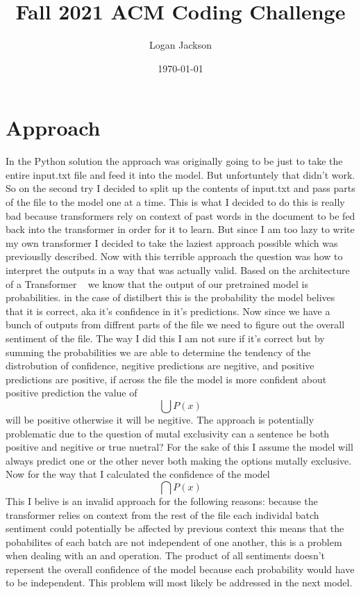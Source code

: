 \documentclass[12pt]{article}
\title{Fall 2021 ACM Coding Challenge}
\author{Logan Jackson}
\date{\today}
\begin{document}
\maketitle{}

\newpage
\section{Approach}
In the Python solution the approach was originally going to be just to
take the entire input.txt file and feed it into the model. But unfortuntely
that didn't work. So on the second try I decided to split up the contents
of input.txt and pass parts of the file to the model one at a time. This
is what I decided to do this is really bad because transformers rely on
context of past words in the document to be fed back into the transformer
in order for it to learn. But since I am too lazy to write my own transformer
I decided to take the laziest approach possible which was previouslly described.
Now with this terrible approach the question was how to interpret the outputs
in a way that was actually valid. Based on the architecture of a Transformer ~\cite{opennmt}
we know that the output of our pretrained model is probabilities.
in the case of distilbert this is the probability the 
model belives that it is correct, aka it's confidence in it's predictions.
Now since we have a bunch of outputs from diffrent parts of the file we need to 
figure out the overall sentiment of the file. The way I did this I am not sure
if it's correct but by summing the probabilities we are able to determine the 
tendency of the distrobution of confidence, negitive predictions are negitive,
and positive predictions are positive, if across the file the model is more confident
about positive prediction the value of $$\bigcup{P(x)}$$ will be positive otherwise
it will be negitive. The approach is potentially problematic due to the question of
mutal exclusivity can a sentence be both positive and negitive or true nuetral? For the sake
of this I assume the model will always predict one or the other never both making the options 
mutally exclusive.
Now for the way that I calculated the confidence of the model $$\bigcap{P(x)}$$
This I belive is an invalid approach for the following reasons:
because the transformer relies on context from the rest of the file each individal batch
sentiment could potentially be affected by previous context this means that the pobabilites 
of each batch are not independent of one another, this is a problem when dealing with
an and operation. The product of all sentiments doesn't repersent the overall confidence of the 
model because each probability would have to be independent. This problem will most likely be
addressed in the next model.
\end{document}
